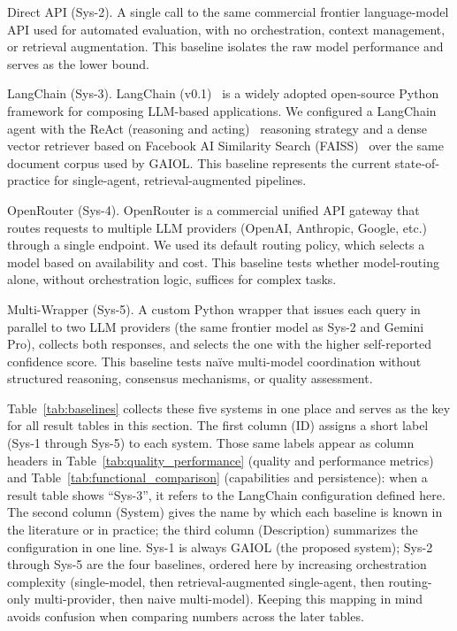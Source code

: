 \documentclass{iopjournal}
\begin{document}
Direct API (Sys-2). A single call to the same commercial frontier language-model API used for automated evaluation, with no orchestration, context management, or retrieval augmentation. This baseline isolates the raw model performance and serves as the lower bound.

LangChain (Sys-3). LangChain (v0.1)~\cite{LangChain} is a widely adopted open-source Python framework for composing LLM-based applications. We configured a LangChain agent with the ReAct (reasoning and acting)~\cite{ReAct} reasoning strategy and a dense vector retriever based on Facebook AI Similarity Search (FAISS)~\cite{DPR} over the same document corpus used by GAIOL. This baseline represents the current state-of-practice for single-agent, retrieval-augmented pipelines.

OpenRouter (Sys-4). OpenRouter is a commercial unified API gateway that routes requests to multiple LLM providers (OpenAI, Anthropic, Google, etc.) through a single endpoint. We used its default routing policy, which selects a model based on availability and cost. This baseline tests whether model-routing alone, without orchestration logic, suffices for complex tasks.

Multi-Wrapper (Sys-5). A custom Python wrapper that issues each query in parallel to two LLM providers (the same frontier model as Sys-2 and Gemini Pro), collects both responses, and selects the one with the higher self-reported confidence score. This baseline tests na\"ive multi-model coordination without structured reasoning, consensus mechanisms, or quality assessment.

Table~\ref{tab:baselines} collects these five systems in one place and serves as the key for all result tables in this section. The first column (ID) assigns a short label (Sys-1 through Sys-5) to each system. Those same labels appear as column headers in Table~\ref{tab:quality_performance} (quality and performance metrics) and Table~\ref{tab:functional_comparison} (capabilities and persistence): when a result table shows ``Sys-3'', it refers to the LangChain configuration defined here. The second column (System) gives the name by which each baseline is known in the literature or in practice; the third column (Description) summarizes the configuration in one line. Sys-1 is always GAIOL (the proposed system); Sys-2 through Sys-5 are the four baselines, ordered here by increasing orchestration complexity (single-model, then retrieval-augmented single-agent, then routing-only multi-provider, then naive multi-model). Keeping this mapping in mind avoids confusion when comparing numbers across the later tables.
\end{document}
